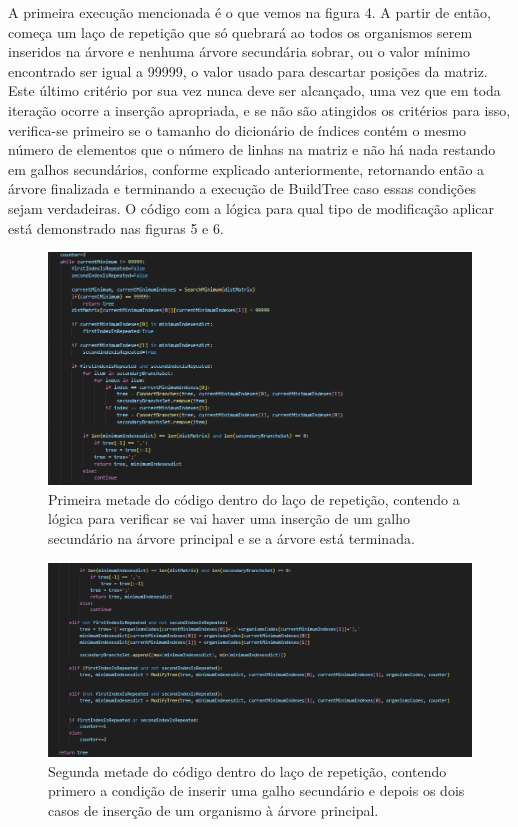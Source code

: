 \documentclass[brazilian,12pt,a4paper,final]{article}
\begin{document}
	 A primeira execução mencionada é o que vemos na figura 4. A partir de então, começa um laço de repetição que só quebrará ao todos os organismos serem inseridos na árvore e nenhuma árvore secundária sobrar, ou o valor mínimo encontrado ser igual a 99999, o valor usado para descartar posições da matriz. Este último critério por sua vez nunca deve ser alcançado, uma vez que em toda iteração ocorre a inserção apropriada, e se não são atingidos os critérios para isso, verifica-se primeiro se o tamanho do dicionário de índices contém o mesmo número de elementos que o número de linhas na matriz e não há nada restando em galhos secundários, conforme explicado anteriormente, retornando então a árvore finalizada e terminando a execução de BuildTree caso essas condições sejam verdadeiras. O código com a lógica para qual tipo de modificação aplicar está demonstrado nas figuras 5 e 6.
	 \vspace{0.5cm}
	 
	 \begin{figure}[hbtp]
	 	\begin{center}
	 		\includegraphics[]{FirstHalf.png}
	 		\caption{Primeira metade do código dentro do laço de repetição, contendo a lógica para
	 			verificar se vai haver uma inserção de um galho secundário na árvore principal e se a árvore está terminada.}
	 		\label{fig}
	 	\end{center}
	 \end{figure}
	 
	 \begin{figure}[hbtp]
	 	\begin{center}
	 		\includegraphics[]{SecondHalf.png}
	 		\caption{Segunda metade do código dentro do laço de repetição, contendo primero a condição de inserir uma galho secundário e depois os dois casos de inserção de um organismo à árvore principal.}
	 		\label{fig}
	 	\end{center}
	 \end{figure}
	 
\end{document}
